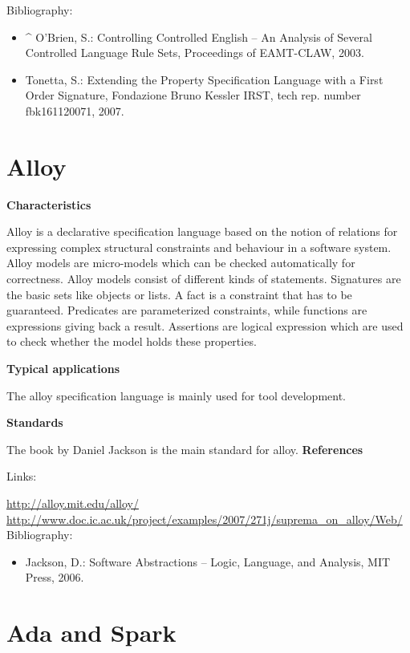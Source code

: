 \documentclass{./template/openetcs_report}
\begin{document}
Bibliography:

\begin{itemize}
\item ^ O'Brien, S.: Controlling Controlled English -- An Analysis of Several Controlled Language Rule Sets, Proceedings of EAMT-CLAW, 2003.
\item Tonetta, S.: Extending the Property Specification Language with a First Order Signature, Fondazione Bruno Kessler IRST, tech rep. number fbk161120071, 2007.
\end{itemize}

\section{Alloy}


	\textbf{Characteristics}

Alloy is a declarative specification language based on the notion of relations for expressing complex structural constraints and behaviour in a software system. Alloy models are micro-models which can be checked automatically for correctness. 
Alloy models consist of different kinds of statements. Signatures are the basic sets like objects or lists. A fact is a constraint that has to be guaranteed. Predicates are parameterized constraints, while functions are expressions giving back a result. Assertions are logical expression which are used to check whether the model holds these properties.

	\textbf{Typical applications}

The alloy specification language is mainly used for tool development.

	\textbf{Standards}

The book by Daniel Jackson is the main standard for alloy.
	\textbf{References}

Links:

\url{http://alloy.mit.edu/alloy/} \\[4pt]
\url{http://www.doc.ic.ac.uk/project/examples/2007/271j/suprema_on_alloy/Web/} \\[4pt]

Bibliography:

\begin{itemize}
\item Jackson, D.: Software Abstractions -- Logic, Language, and Analysis, MIT Press, 2006. 
\end{itemize}

\section{Ada and Spark}
\end{document}
